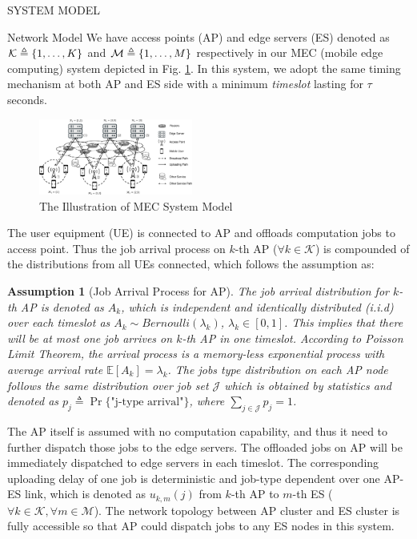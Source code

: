 \documentclass[10pt, conference, letterpaper]{IEEEtran}
\newtheorem{assumption}{Assumption}
\newcommand{\define}{\triangleq}
\DeclarePairedDelimiter{\set}{\{}{\}}
\newcommand{\apSet}{\mathcal{K}}
\newcommand{\esSet}{\mathcal{M}}
\newcommand{\jSpace}{\mathcal{J}}
\begin{document}
    \begin{section}{SYSTEM MODEL}
        \label{sec:model}
        \begin{subsection}{Network Model}
            We have access points (AP) and edge servers (ES) denoted as $\apSet \define \set{1,\dots,K}$ and $\mathcal{M} \define \set{1,\dots,M}$ respectively in our MEC (mobile edge computing) system depicted in Fig. \ref{fig:system}. In this system, we adopt the same timing mechanism at both AP and ES side with a minimum \emph{timeslot} lasting for $\tau$ seconds.

            \begin{figure}[ht]
                \centering
                \includegraphics[width=0.45\textwidth, trim={0.5cm 0.5cm 0.5cm 0.5cm}, clip]{system-model.pdf}
                \caption{The Illustration of MEC System Model}
                \label{fig:system}
            \end{figure}

            The user equipment (UE) is connected to AP and offloads computation jobs to access point. Thus the job arrival process on $k$-th AP ($\forall k\in\apSet$) is compounded of the distributions from all UEs connected, which follows the assumption as:
            \begin{assumption}[Job Arrival Process for AP]
                The job arrival distribution for $k$-th AP is denoted as $A_k$, which is independent and identically distributed (i.i.d) over each timeslot as $A_k \sim Bernoulli(\lambda_k)$, $\lambda_k\in[0,1]$. This implies that there will be at most one job arrives on $k$-th AP in one timeslot. According to \emph{Poisson Limit Theorem}, the arrival process is a memory-less exponential process with average arrival rate $\mathbb{E}[A_k]=\lambda_k$.
                The jobs type distribution on each AP node follows the same distribution over job set $\jSpace$ which is obtained by statistics and denoted as $p_j \define \Pr\{\text{"j-type arrival"}\}$, where $\sum_{j\in\jSpace} p_j=1$.
            \end{assumption}

            The AP itself is assumed with no computation capability, and thus it need to further dispatch those jobs to the edge servers.
            The offloaded jobs on AP will be immediately dispatched to edge servers in each timeslot. The corresponding uploading delay of one job is {\color{red}deterministic and job-type dependent} over one AP-ES link, which is denoted as $u_{k,m}(j)$ from $k$-th AP to $m$-th ES ($\forall k\in\apSet, \forall m\in\esSet$).
            The network topology between AP cluster and ES cluster is fully accessible so that AP could dispatch jobs to any ES nodes in this system.


\end{subsection}
\end{section}
\end{document}
